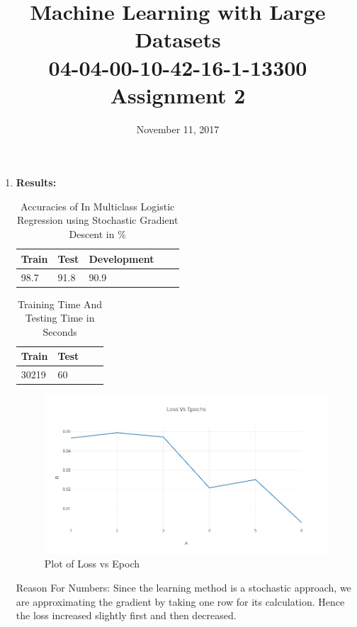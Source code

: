 \documentclass[flalign]{article}
\begin{document}
	\title{Machine Learning with Large Datasets\\04-04-00-10-42-16-1-13300\\ Assignment 2}
	\date{November 11, 2017}
	\maketitle
	
	\begin{enumerate}
		\item	\textbf{Results:}
		\begin{table}[h]
			\centering
			\caption{Accuracies of In Multiclass Logistic Regression using Stochastic Gradient Descent in  \%}
			\begin{tabular}{|l|l|l|l|l|}
				\hline
				Train & Test  & Development \\ \hline
			 	98.7 & 91.8 & 90.9 \\ \hline
			\end{tabular}
		\end{table}
		\begin{table}[h]
			\centering
			\caption{Training Time And Testing Time in Seconds}
			\begin{tabular}{|l|l|l|l|}
				\hline
				Train & Test  \\ \hline
			 	30219 & 60 \\ \hline
			\end{tabular}
		\end{table}
		\begin{figure}[H]
			\centering
			\includegraphics[scale=0.4]{f1.png}
			\caption{Plot of Loss vs Epoch}
		\end{figure}
		
		Reason For Numbers: Since the learning method is a stochastic approach, we are approximating the gradient by taking one row for its calculation. Hence the loss increased slightly first and then decreased. 
		

\end{enumerate}
\end{document}
